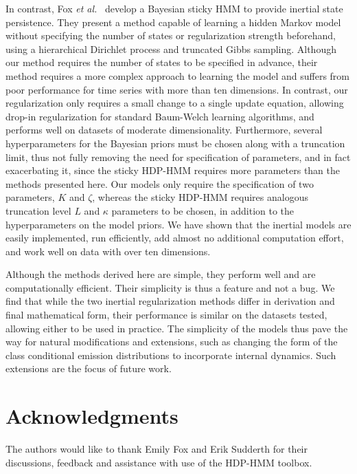 \documentclass[12pt]{article}
\begin{document}
In contrast, Fox \emph{et al.}\ \cite{fox2011sticky} develop a Bayesian sticky HMM to provide inertial state persistence. They present a method capable of learning a hidden Markov model without specifying the number of states or regularization strength beforehand, using a hierarchical Dirichlet process and truncated Gibbs sampling. Although our method requires the number of states to be specified in advance, their method requires a more complex approach to learning the model and suffers from poor performance for time series with more than ten dimensions. In contrast, our regularization only requires a small change to a single update equation, allowing drop-in regularization for standard Baum-Welch learning algorithms, and performs well on datasets of moderate dimensionality. Furthermore, several hyperparameters for the Bayesian priors must be chosen along with a truncation limit, thus not fully removing the need for specification of parameters, and in fact exacerbating it, since the sticky HDP-HMM requires more parameters than the methods presented here. Our models only require the specification of two parameters, $K$ and $\zeta$, whereas the sticky HDP-HMM requires analogous truncation level $L$ and $\kappa$ parameters to be chosen, in addition to the hyperparameters on the model priors. We have shown that the inertial models are easily implemented, run efficiently, add almost no additional computation effort, and work well on data with over ten dimensions.

Although the methods derived here are simple, they perform well and are computationally efficient. Their simplicity is thus a feature and not a bug. We find that while the two inertial regularization methods differ in derivation and final mathematical form, their performance is similar on the datasets tested, allowing either to be used in practice.  The simplicity of the models thus pave the way for natural modifications and extensions, such as changing the form of the class conditional emission distributions to incorporate internal dynamics. Such extensions are the focus of future work.

\section{Acknowledgments}

The authors would like to thank Emily Fox and Erik Sudderth for their discussions, feedback and assistance with use of the HDP-HMM toolbox.



\end{document}

